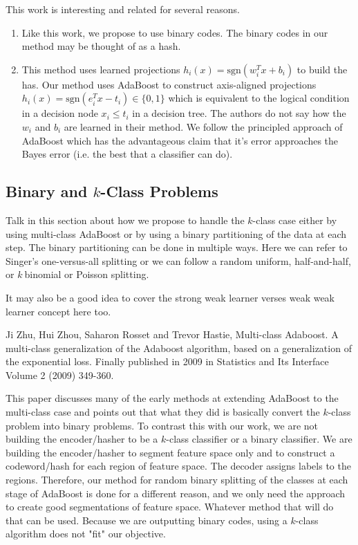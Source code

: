 \documentclass{article}
\begin{document}
This work is interesting and related for several reasons.
\begin{enumerate}
\item Like this work, we propose to use binary codes.  The binary codes in our method may be thought of as a hash.
\item This method uses learned projections $h_i(x) = \text{sgn}(w_i^T x + b_i)$ to build the has.  Our method uses AdaBoost to construct axis-aligned projections $h_i(x) = \text{sgn}(e_i^T x - t_i) \in \{0,1\}$ which is equivalent to the logical condition in a decision node $x_i \leq t_i$ in a decision tree.  The authors do not say how the $w_i$ and $b_i$ are learned in their method.  We follow the principled approach of AdaBoost which has the advantageous claim that it's error approaches the Bayes error (i.e. the best that a classifier can do).
\end{enumerate}

\subsection{Binary and $k$-Class Problems}

Talk in this section about how we propose to handle the $k$-class case either by using multi-class AdaBoost or by using a binary partitioning of the data at each step.  The binary partitioning can be done in multiple ways.  Here we can refer to Singer's one-versus-all splitting or we can follow a random uniform, half-and-half, or $k~$binomial or Poisson splitting.

It may also be a good idea to cover the strong weak learner verses weak weak learner concept here too.

Ji Zhu, Hui Zhou, Saharon Rosset and Trevor Hastie, Multi-class Adaboost. A multi-class generalization of the Adaboost algorithm, based on a generalization of the exponential loss.
Finally published in 2009 in Statistics and Its Interface Volume 2 (2009) 349-360.

This paper discusses many of the early methods at extending AdaBoost to the multi-class case and points out that what they did is basically convert the $k$-class problem into binary problems.  To contrast this with our work, we are not building the encoder/hasher to be a $k$-class classifier or a binary classifier.  We are building the encoder/hasher to segment feature space only and to construct a codeword/hash for each region of feature space.  The decoder assigns labels to the regions.  Therefore, our method for random binary splitting of the classes at each stage of AdaBoost is done for a different reason, and we only need the approach to create good segmentations of feature space.  Whatever method that will do that can be used.  Because we are outputting binary codes, using a $k$-class algorithm does not "fit" our objective.
\end{document}
